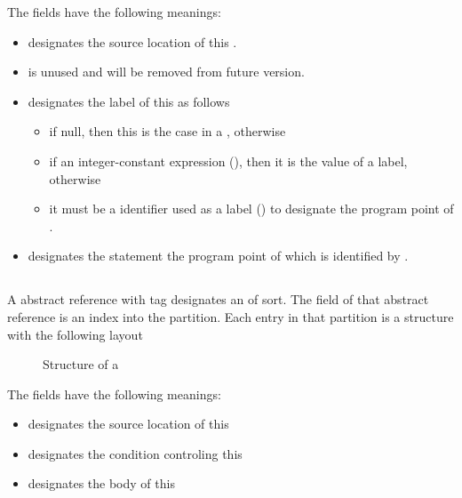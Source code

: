 The fields have the following meanings:
\begin{itemize}
	\item {} designates the source location of this .
	\item {} is unused and will be removed from future version.
	\item {} designates the label of this  as follows
		\begin{itemize}
			\item if null, then this is the  case in a , otherwise
			\item if an integer-constant expression (), then it is the value of a  label, otherwise
			\item it must be a identifier used as a label () to designate the program point of .
		\end{itemize}
	\item {} designates the statement the program point of which is identified by .
\end{itemize}




\subsection{}
\label{sec:ifc:StmtSort:While}

A  abstract reference with tag  designates an  of  sort.
The  field of that abstract reference is an index into the  partition.
Each entry in that partition is a structure with the following layout
%
\begin{figure}[H]
	\centering
	\caption{Structure of a }
	\label{fig:ifc-while-stmt-structure}
\end{figure}
%
The fields have the following meanings:
\begin{itemize}
	\item {} designates the source location of this 
	\item {} designates the condition controling this 
	\item {} designates the body of this 
\end{itemize}

